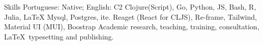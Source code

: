 
\begin{rubric}{Skills}
\entry*[Languages]
Portuguese: Native; English: C2
Clojure(Script), Go, Python, JS, Bash, R, Julia, \LaTeX
\entry*[Databases]
	Mysql, Postgres, ite.
    Reaget (React for CLJS), Re-frame, Tailwind, Material UI (MUI), Boostrap
\entry*[Misc.]
	Academic research, teaching, training, consultation, \LaTeX\ typesetting and publishing.
\end{rubric}
